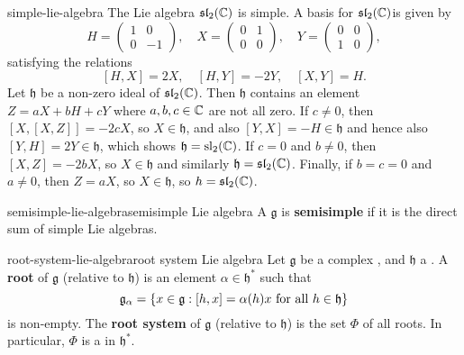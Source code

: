 \begin{example}{simple-lie-algebra}
    The Lie algebra $\mathfrak{sl}_2(\mathbb{C})$ is simple. A basis for $\mathfrak{sl}_2(\mathbb{C})$is given by
    \[ H = \begin{pmatrix} 1 & 0 \\ 0 & -1 \end{pmatrix}, \quad X = \begin{pmatrix} 0 & 1 \\ 0 & 0 \end{pmatrix}, \quad Y = \begin{pmatrix} 0 & 0 \\ 1 & 0 \end{pmatrix} , \]
    satisfying the relations
    \[ [H, X] = 2X, \quad [H, Y] = -2Y, \quad [X, Y] = H . \]
    Let $\mathfrak{h}$ be a non-zero ideal of $\mathfrak{sl}_2(\mathbb{C})$. Then $\mathfrak{h}$ contains an element $Z = aX + bH + cY$ where $a, b, c \in \mathbb{C}$ are not all zero. If $c \ne 0$, then $[X, [X, Z]] = -2cX$, so $X \in \mathfrak{h}$, and also $[Y, X] = -H \in \mathfrak{h}$ and hence also $[Y, H] = 2Y \in \mathfrak{h}$, which shows $\mathfrak{h} = \textup{sl}_2(\mathbb{C})$. If $c = 0$ and $b \ne 0$, then $[X, Z] = -2bX$, so $X \in \mathfrak{h}$ and similarly $\mathfrak{h} = \mathfrak{sl}_2(\mathbb{C})$. Finally, if $b = c = 0$ and $a \ne 0$, then $Z = aX$, so $X \in \mathfrak{h}$, so $h = \mathfrak{sl}_2(\mathbb{C})$.
\end{example}

\begin{topic}{semisimple-lie-algebra}{semisimple Lie algebra}
    A  $\mathfrak{g}$ is \textbf{semisimple} if it is the direct sum of simple Lie algebras.
\end{topic}

\begin{topic}{root-system-lie-algebra}{root system Lie algebra}
    Let $\mathfrak{g}$ be a complex  , and $\mathfrak{h}$ a . A \textbf{root} of $\mathfrak{g}$ (relative to $\mathfrak{h}$) is an element $\alpha \in \mathfrak{h}^*$ such that
    \[ \mathfrak{g}_\alpha = \{ x \in \mathfrak{g} : [h, x] = \alpha(h) x \textup{ for all } h \in \mathfrak{h} \} \]
    is non-empty. The \textbf{root system} of $\mathfrak{g}$ (relative to $\mathfrak{h}$) is the set $\Phi$ of all roots. In particular, $\Phi$ is a  in $\mathfrak{h}^*$.
\end{topic}

